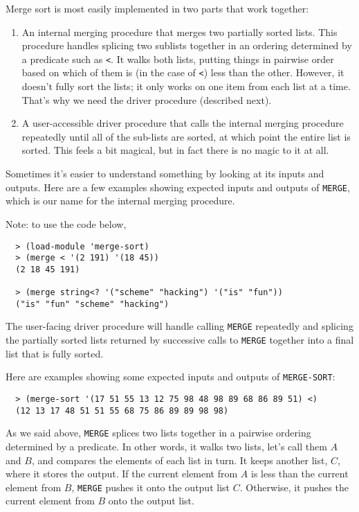 \documentclass[12pt,openright,draft]{book}
\begin{document}
Merge sort is most easily implemented in two parts that work together:

\begin{enumerate}

\item An internal merging procedure that merges two partially sorted
  lists.  This procedure handles splicing two sublists together in an
  ordering determined by a predicate such as \verb|<|. It walks both
  lists, putting things in pairwise order based on which of them is
  (in the case of \verb|<|) less than the other.  However, it doesn't
  fully sort the lists; it only works on one item from each list at a
  time.  That's why we need the driver procedure (described next).

\item A user-accessible driver procedure that calls the internal
  merging procedure repeatedly until all of the sub-lists are sorted,
  at which point the entire list is sorted.  This feels a bit magical,
  but in fact there is no magic to it at all.

\end{enumerate}

Sometimes it's easier to understand something by looking at its inputs
and outputs.  Here are a few examples showing expected inputs and
outputs of \verb|MERGE|, which is our name for the internal merging
procedure.

Note: to use the code below, 

\begin{verbatim}
  > (load-module 'merge-sort)
  > (merge < '(2 191) '(18 45))
  (2 18 45 191)

  > (merge string<? '("scheme" "hacking") '("is" "fun"))
  ("is" "fun" "scheme" "hacking")
\end{verbatim}

The user-facing driver procedure will handle calling \verb|MERGE|
repeatedly and splicing the partially sorted lists returned by
successive calls to \verb|MERGE| together into a final list that is
fully sorted.

Here are examples showing some expected inputs and outputs of
\verb|MERGE-SORT|:

\begin{verbatim}
  > (merge-sort '(17 51 55 13 12 75 98 48 98 89 68 86 89 51) <)
  (12 13 17 48 51 51 55 68 75 86 89 89 98 98)
\end{verbatim}

As we said above, \verb|MERGE| splices two lists together in a
pairwise ordering determined by a predicate.  In other words, it walks
two lists, let's call them $A$ and $B$, and compares the elements of
each list in turn.  It keeps another list, $C$, where it stores the
output.  If the current element from $A$ is less than the current
element from $B$, \verb|MERGE| pushes it onto the output list $C$.
Otherwise, it pushes the current element from $B$ onto the output
list.
\end{document}
